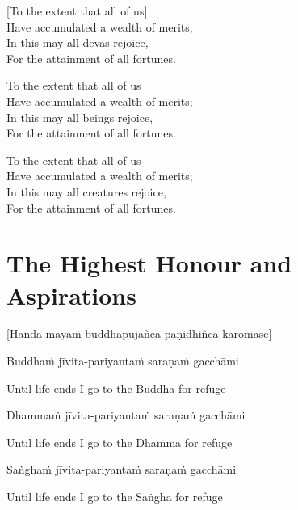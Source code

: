 \begin{english}
  [To the extent that all of us]\\
  Have accumulated a wealth of merits;\\
  In this may all devas rejoice,\\
  For the attainment of all fortunes.
\end{english}

\begin{english}
  To the extent that all of us\\
  Have accumulated a wealth of merits;\\
  In this may all beings rejoice,\\
  For the attainment of all fortunes.
\end{english}

\begin{english}
  To the extent that all of us\\
  Have accumulated a wealth of merits;\\
  In this may all creatures rejoice,\\
  For the attainment of all fortunes.
\end{english}



\section{The Highest Honour and Aspirations}
\label{highest-honour-aspirations}

\begin{center}
  [Handa mayaṁ buddhapūjañca paṇidhiñca karomase]
\end{center}

Buddhaṁ jīvita-pariyantaṁ saraṇaṁ gacchāmi

\begin{english}
  Until life ends I go to the Buddha for refuge
\end{english}

Dhammaṁ jīvita-pariyantaṁ saraṇaṁ gacchāmi

\begin{english}
  Until life ends I go to the Dhamma for refuge
\end{english}

Saṅghaṁ jīvita-pariyantaṁ saraṇaṁ gacchāmi

\begin{english}
  Until life ends I go to the Saṅgha for refuge
\end{english}

